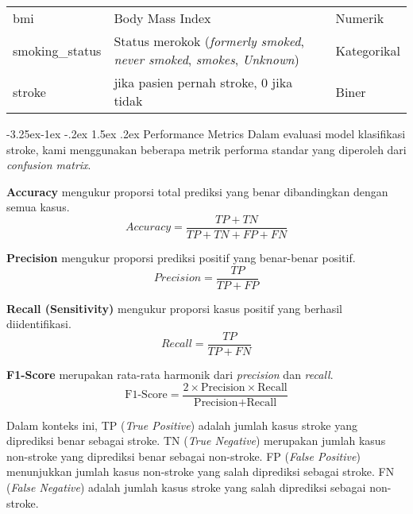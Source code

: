 \documentclass[10pt]{article}
\makeatletter
\renewcommand\subsection{\@startsection{subsection}{2}{\z@}%
  {-3.25ex\@plus -1ex \@minus -.2ex}%
  {1.5ex \@plus .2ex}%
  {\normalfont\itshape\normalsize}}
\makeatother
\begin{document}
\begin{multicols}{2}
\begin{table}[H]
{\begin{tabular}{>{\raggedright\arraybackslash}p{2cm}>{\raggedright\arraybackslash}p{3cm}>{\raggedright\arraybackslash}p{1.5cm}}
                bmi                 & Body Mass Index                                                                                                          & Numerik            \\
                smoking\_status     & Status merokok (\textit{formerly smoked}, \textit{never smoked}, \textit{smokes}, \textit{Unknown})                      & Kategorikal        \\
                stroke              & 1 jika pasien pernah stroke, 0 jika tidak                                                                                & Biner              \\
                \bottomrule
            \end{tabular}}
    \end{table}

    \subsection{Performance Metrics}
    Dalam evaluasi model klasifikasi stroke, kami menggunakan beberapa metrik
    performa standar yang diperoleh dari \textit{confusion matrix}.

    \textbf{Accuracy} mengukur proporsi total prediksi yang benar dibandingkan dengan semua kasus.
    \begin{equation}
        Accuracy = \frac{TP + TN}{TP + TN + FP + FN}
    \end{equation}

    \textbf{Precision} mengukur proporsi prediksi positif yang benar-benar positif.
    \begin{equation}
        Precision = \frac{TP}{TP + FP}
    \end{equation}

    \textbf{Recall (Sensitivity)} mengukur proporsi kasus positif yang berhasil diidentifikasi.
    \begin{equation}
        Recall = \frac{TP}{TP + FN}
    \end{equation}

    \textbf{F1-Score} merupakan rata-rata harmonik dari \textit{precision} dan \textit{recall}.
    \begin{equation}
        \text{F1-Score} = \frac{2 \times \text{Precision} \times \text{Recall}}{\text{Precision} + \text{Recall}}
    \end{equation}

    Dalam konteks ini, TP (\textit{True Positive}) adalah jumlah kasus stroke yang
    diprediksi benar sebagai stroke. TN (\textit{True Negative}) merupakan jumlah
    kasus non-stroke yang diprediksi benar sebagai non-stroke. FP (\textit{False
        Positive}) menunjukkan jumlah kasus non-stroke yang salah diprediksi sebagai
    stroke. FN (\textit{False Negative}) adalah jumlah kasus stroke yang salah
    diprediksi sebagai non-stroke.


\end{multicols}
\end{document}
